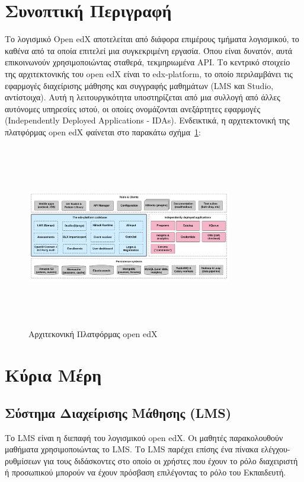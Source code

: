 \documentclass[12pt]{report}
\begin{document}
\section{Συνοπτική Περιγραφή}
Το λογισμικό \textlatin{Open edX} αποτελείται από διάφορα επιμέρους τμήματα λογισμικού, το καθένα από τα οποία επιτελεί μια συγκεκριμένη εργασία. Όπου είναι δυνατόν, αυτά επικοινωνούν χρησιμοποιώντας σταθερά, τεκμηριωμένα API. Το κεντρικό στοιχείο της αρχιτεκτονικής του \textlatin{open edX} είναι το \textlatin{edx-platform}, το οποίο περιλαμβάνει τις εφαρμογές διαχείρισης μάθησης και συγγραφής μαθημάτων (\textlatin{LMS} και \textlatin{Studio}, αντίστοιχα). Αυτή η λειτουργικότητα υποστηρίζεται από μια συλλογή από άλλες αυτόνομες υπηρεσίες ιστού, οι οποίες ονομάζονται ανεξάρτητες εφαρμογές (\textlatin{Independently Deployed Applications - IDAs}). Ενδεικτικά, η αρχιτεκτονική της πλατφόρμας \textlatin{open edX} φαίνεται στο παρακάτω σχήμα~\ref{fig:edx_arch}:
\begin{figure}[h]
\centering
\includegraphics[width=0.8\textwidth, height=8cm]{edx-architecture}
\caption{Αρχιτεκονική Πλατφόρμας \textlatin{open edX}}
\label{fig:edx_arch}
\end{figure}

\section{Κύρια Μέρη}
\subsection{Σύστημα Διαχείρισης Μάθησης (\textlatin{LMS})}
Το \textlatin{LMS} είναι η διεπαφή του λογισμικού \textlatin{open edX}. Οι μαθητές παρακολουθούν μαθήματα χρησιμοποιώντας το \textlatin{LMS}. Το LMS παρέχει επίσης ένα πίνακα ελέγχου-ρυθμίσεων για τους διδάσκοντες στο οποίο οι χρήστες που έχουν το ρόλο διαχειριστή ή προσωπικού μπορούν να έχουν πρόσβαση επιλέγοντας το ρόλο του Εκπαιδευτή.
\end{document}
